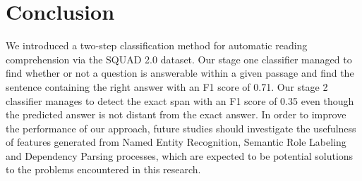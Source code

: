 \section{Conclusion}
We introduced a two-step classification method for automatic reading comprehension via the SQUAD 2.0 dataset. Our stage one classifier managed to find whether or not a question is answerable within a given passage and find the sentence containing the right answer with an F1 score of 0.71. Our stage 2 classifier manages to detect the exact span with an F1 score of 0.35 even though the predicted answer is not distant from the exact answer. In order to improve the performance of our approach, future studies should investigate the usefulness of features generated from Named Entity Recognition, Semantic Role Labeling and Dependency Parsing processes, which are expected to be potential solutions to the problems encountered in this research.

